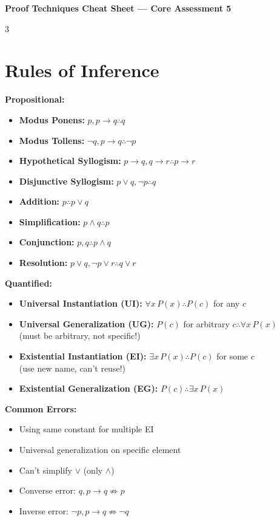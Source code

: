 \documentclass[8pt]{article}
\begin{document}
\begin{center}
\textbf{\large Proof Techniques Cheat Sheet --- Core Assessment 5}
\end{center}
\vspace{-6pt}

\begin{multicols}{3}
\small

\section*{Rules of Inference}
\textbf{Propositional:}
\begin{itemize}[nosep]
\item \textbf{Modus Ponens:} $p, p \to q \therefore q$
\item \textbf{Modus Tollens:} $\neg q, p \to q \therefore \neg p$
\item \textbf{Hypothetical Syllogism:} $p \to q, q \to r \therefore p \to r$
\item \textbf{Disjunctive Syllogism:} $p \lor q, \neg p \therefore q$
\item \textbf{Addition:} $p \therefore p \lor q$
\item \textbf{Simplification:} $p \land q \therefore p$
\item \textbf{Conjunction:} $p, q \therefore p \land q$
\item \textbf{Resolution:} $p \lor q, \neg p \lor r \therefore q \lor r$
\end{itemize}

\textbf{Quantified:}
\begin{itemize}[nosep]
\item \textbf{Universal Instantiation (UI):} $\forall x\, P(x) \therefore P(c)$ for any $c$
\item \textbf{Universal Generalization (UG):} $P(c)$ for arbitrary $c \therefore \forall x\, P(x)$
  \\ (must be arbitrary, not specific!)
\item \textbf{Existential Instantiation (EI):} $\exists x\, P(x) \therefore P(c)$ for some $c$
  \\ (use new name, can't reuse!)
\item \textbf{Existential Generalization (EG):} $P(c) \therefore \exists x\, P(x)$
\end{itemize}

\textbf{Common Errors:}
\begin{itemize}[nosep]
\item Using same constant for multiple EI
\item Universal generalization on specific element
\item Can't simplify $\lor$ (only $\land$)
\item Converse error: $q, p \to q \not\Rightarrow p$
\item Inverse error: $\neg p, p \to q \not\Rightarrow \neg q$
\end{itemize}
\newcolumn

\end{multicols}
\end{document}
